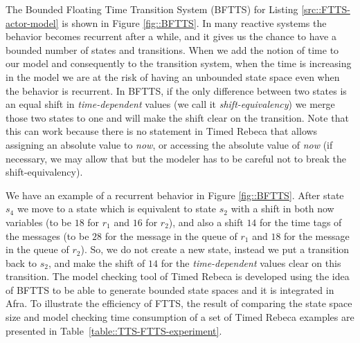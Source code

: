 The Bounded Floating Time Transition System (BFTTS) for Listing \ref{src::FTTS-actor-model} is shown in Figure \ref{fig::BFTTS}. 
In many reactive systems the behavior becomes recurrent after a while, and it gives us the chance to have a bounded number of states and transitions. When we add the notion of time to our model and consequently to the transition system, when the time is increasing in the model we are at the risk of having an unbounded %
state space even when the behavior is recurrent.
In BFTTS, if the only difference between two states is an equal shift in \textit{time-dependent} values (we call it \textit{shift-equivalency}) we merge those two states to one and will make the shift clear on the transition. %
Note that this can work because there is no statement in Timed Rebeca that allows assigning an absolute value to \textit{now}, or accessing the absolute value of \textit{now} (if necessary, we may allow that but the modeler has to be careful not to break the shift-equivalency). 

We have an example of a recurrent behavior in Figure \ref{fig::BFTTS}. After state $s_4$ we move to a state which is equivalent to state $s_2$ with a shift in both now variables (to be $18$ for $r_1$  and $16$ for $r_2$), and also a shift $14$ for the time tags of the messages (to be $28$ for the message in the queue of $r_1$ and $18$ for the message in the queue of $r_2$). So, we do not create a new state, instead we put a transition back to $s_2$, and make the shift of $14$ for the \textit{time-dependent} values clear on this transition. The model checking tool of Timed Rebeca is developed using the idea of BFTTS to be able to generate bounded state spaces and it is integrated in Afra. To illustrate the efficiency of FTTS, the result of comparing the state space size and model checking time consumption of a set of Timed Rebeca examples are presented in Table~\ref{table::TTS-FTTS-experiment}.


